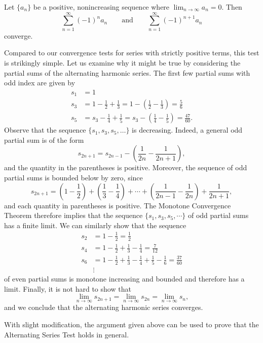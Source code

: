 \documentclass{ximera}
\begin{document}
\begin{theorem}
Let $\{a_n\}$ be a positive, nonincreasing sequence where
$\lim_{n\to\infty}a_n=0$. Then
\[
\sum_{n=1}^\infty (-1)^{n}a_n \qquad \text{and}\qquad \sum_{n=1}^\infty (-1)^{n+1}a_n 
\]
converge.
\end{theorem}

Compared to our convergence tests for series with strictly positive terms, this test is strikingly simple. Let us examine why it might be true by considering the partial sums of the alternating harmonic series. The first few partial sums with odd index are given by 
\begin{align*}
s_1 &= 1 \\
s_3 &= 1 - \frac{1}{2} + \frac{1}{3} = 1 - \left(\frac{1}{2} - \frac{1}{3}\right) = \frac{5}{6} \\
s_5 &= s_3 - \frac{1}{4} + \frac{1}{5} = s_3 - \left( \frac{1}{4} - \frac{1}{5}\right) = \frac{47}{60}.
\end{align*}
Observe that the sequence $\{s_1,s_3,s_5,\ldots\}$ is decreasing. Indeed, a general odd partial sum is of the form
$$
s_{2n+1} = s_{2n-1} - \left(\frac{1}{2n} - \frac{1}{2n+1}\right),
$$
and the quantity in the parentheses is positive. Moreover, the sequence of odd partial sums is bounded below by zero, since
$$
s_{2n+1} = \left(1 - \frac{1}{2}\right) + \left(\frac{1}{3} - \frac{1}{4}\right) + \cdots + \left(\frac{1}{2n-1}-\frac{1}{2n}\right) + \frac{1}{2n+1},
$$
and each quantity in parentheses is positive. The Monotone Convergence Theorem therefore implies that the sequence $\{s_1,s_3,s_5,\cdots\}$ of odd partial sums has a finite limit. We can similarly show that the sequence
\begin{align*}
s_2 &= 1 - \frac{1}{2} = \frac{1}{2} \\
s_4 &= 1- \frac{1}{2} + \frac{1}{3} - \frac{1}{4} = \frac{7}{12} \\
s_6 &= 1 - \frac{1}{2} + \frac{1}{3} - \frac{1}{4} + \frac{1}{5} - \frac{1}{6} = \frac{37}{60} \\
&\vdots
\end{align*}
of even partial sums is monotone increasing and bounded and therefore has a limit. Finally, it is not hard to show that 
$$
\lim_{n\rightarrow \infty} s_{2n+1} = \lim_{n \rightarrow \infty} s_{2n} = \lim_{n \rightarrow \infty} s_n,
$$
and we conclude that the alternating harmonic series converges. 

With slight modification, the argument given above can be used to prove that the Alternating Series Test holds in general.
\end{document}
